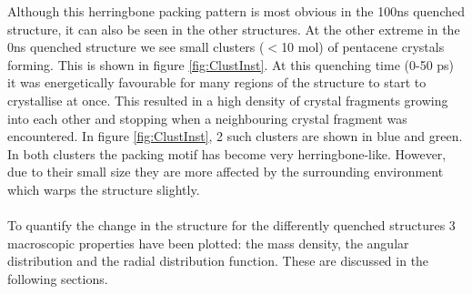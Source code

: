 Although this herringbone packing pattern is most obvious in the 100ns quenched structure, it can also be seen in the other structures. At the other extreme in the 0ns quenched structure we see small clusters ($<$10 mol) of pentacene crystals forming. This is shown in figure \ref{fig:ClustInst}. At this quenching time (0-50 ps) it was energetically favourable for many regions of the structure to start to crystallise at once. This resulted in a high density of crystal fragments growing into each other and stopping when a neighbouring crystal fragment was encountered. In figure \ref{fig:ClustInst}, 2 such clusters are shown in blue and green. In both clusters the packing motif has become very herringbone-like. However, due to their small size they are more affected by the surrounding environment which warps the structure slightly. 
\\\\
\noindent To quantify the change in the structure for the differently quenched structures 3 macroscopic properties have been plotted: the mass density, the angular distribution and the radial distribution function. These are discussed in the following sections.
